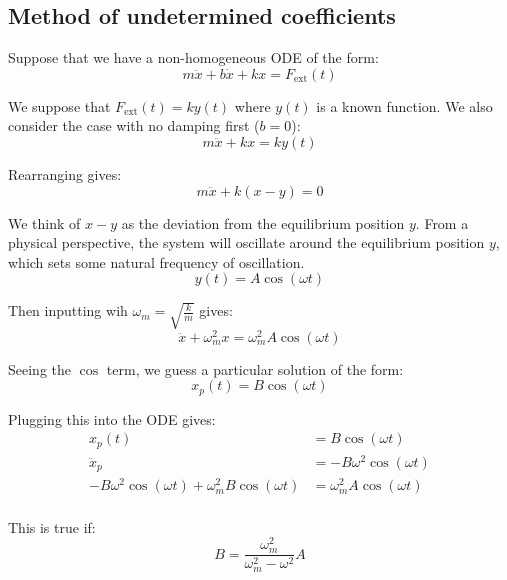 \subsection{Method of undetermined coefficients}

Suppose that we have a non-homogeneous ODE of the form:
\begin{equation*}
m \ddot x + b \dot x + k x = F_{\text{ext}}(t)
\end{equation*}

We suppose that $F_{\text{ext}}(t) = k y(t)$ where $y(t)$ is a known function. We also consider the case with no damping first ($b=0$):
\begin{equation*}
m \ddot x + k x = k y(t)
\end{equation*}

Rearranging gives:
\begin{equation*}
m \ddot x + k (x - y) = 0
\end{equation*}

We think of $x-y$ as the deviation from the equilibrium position $y$. From a physical perspective, the system will oscillate around the equilibrium position $y$, which sets some natural frequency of oscillation. 
\begin{equation*}
y(t) = A \cos(\omega t)
\end{equation*}

Then inputting wih $\omega_m = \sqrt{\frac{k}{m}}$ gives:
\begin{equation*}
\ddot x + \omega_m^2 x = \omega_m^2 A \cos(\omega t)
\end{equation*}

Seeing the $\cos$ term, we guess a particular solution of the form:
\begin{equation*}
x_p(t) = B \cos (\omega t)
\end{equation*}

Plugging this into the ODE gives:
\begin{align*}
x_p(t) &= B \cos (\omega t) \\
\ddot x_p &= -B \omega^2 \cos (\omega t) \\
-B \omega^2 \cos (\omega t) + \omega_m^2 B \cos (\omega t) &= \omega_m^2 A \cos(\omega t) \\
\end{align*}

This is true if:
\begin{equation*}
\boxed{
B = \frac{\omega_m^2}{\omega_m^2 - \omega^2} A
}
\end{equation*}


